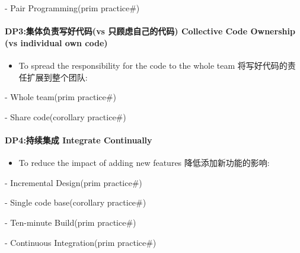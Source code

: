 \documentclass{book}        %
\providecommand{\tightlist}{%
  \setlength{\itemsep}{0pt}\setlength{\parskip}{0pt}}
\let\oldparagraph\paragraph
\renewcommand{\paragraph}[1]{\oldparagraph{#1}\mbox{}}
\begin{document}
\begin{description}
\tightlist
\item[]
- Pair Programming(prim practice\#)
\end{description}

\hypertarget{dp3ux96c6ux4f53ux8d1fux8d23ux5199ux597dux4ee3ux7801vs-ux53eaux987eux8651ux81eaux5df1ux7684ux4ee3ux7801-collective-code-ownership-vs-individual-own-code}{%
\paragraph{DP3:集体负责写好代码(vs 只顾虑自己的代码) Collective Code
Ownership (vs individual own
code)}\label{dp3ux96c6ux4f53ux8d1fux8d23ux5199ux597dux4ee3ux7801vs-ux53eaux987eux8651ux81eaux5df1ux7684ux4ee3ux7801-collective-code-ownership-vs-individual-own-code}}

\begin{itemize}
\tightlist
\item
  To spread the responsibility for the code to the whole team
  将写好代码的责任扩展到整个团队:\\
\end{itemize}

\begin{description}
\tightlist
\item[]
- Whole team(prim practice\#)

- Share code(corollary practice\#)
\end{description}

\hypertarget{dp4ux6301ux7eedux96c6ux6210-integrate-continually}{%
\paragraph{DP4:持续集成 Integrate
Continually}\label{dp4ux6301ux7eedux96c6ux6210-integrate-continually}}

\begin{itemize}
\tightlist
\item
  To reduce the impact of adding new features 降低添加新功能的影响:
\end{itemize}

\begin{description}
\tightlist
\item[]
- Incremental Design(prim practice\#)

- Single code base(corollary practice\#)

- Ten-minute Build(prim practice\#)

- Continuous Integration(prim practice\#)
\end{description}
\end{document}
